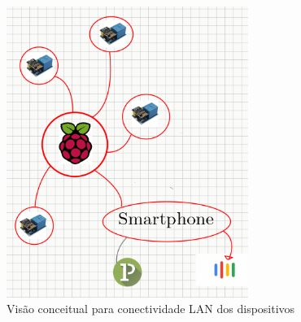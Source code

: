 \documentclass[11pt]{article}
\begin{document}
\begin{figure}[h!]
\caption{\label{fig:lan_concept}Visão conceitual para conectividade LAN dos dispositivos}
\centering
\includegraphics[width=0.7\textwidth]{./lan_concept.png}
\end{figure}
\end{document}
